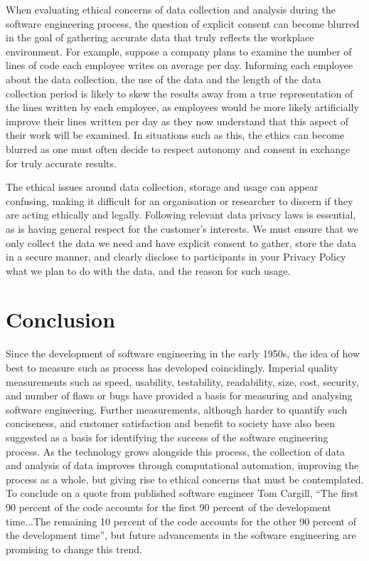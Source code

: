 \documentclass{article}
\begin{document}
When evaluating ethical concerns of data collection and analysis during the software engineering process, the question of explicit consent can become blurred in the goal of gathering accurate data that truly reflects the workplace environment. For example, suppose a company plans to examine the number of lines of code each employee writes on average per day. Informing each employee about the data collection, the use of the data and the length of the data collection period is likely to skew the results away from a true representation of the lines written by each employee, as employees would be more likely artificially improve their lines written per day as they now understand that this aspect of their work will be examined. In situations such as this, the ethics can become blurred as one must often decide to respect autonomy and consent in exchange for truly accurate results. \newline

The ethical issues around data collection, storage and usage can appear confusing, making it difficult for an organisation or researcher to discern if they are acting ethically and legally. Following relevant data privacy laws is essential, as is having general respect for the customer’s interests. We must ensure that we only collect the data we need and have explicit consent to gather, store the data in a secure manner, and clearly disclose to participants in your Privacy Policy what we plan to do with the data, and the reason for such usage.  \newline

\section{Conclusion} Since the development of software engineering in the early 1950s, the idea of how best to measure such as process has developed coincidingly. Imperial quality measurements such as speed, usability, testability, readability, size, cost, security, and number of flaws or bugs have provided a basis for measuring and analysing software engineering. Further measurements, although harder to quantify such conciseness, and customer satisfaction and benefit to society have also been suggested as a basis for identifying the success of the software engineering process. As the technology grows alongside this process, the collection of data and analysis of data improves through computational automation, improving the process as a whole, but giving rise to ethical concerns that must be contemplated. To conclude on a quote from published software engineer Tom Cargill, ``The first 90 percent of the code accounts for the first 90 percent of the development time...The remaining 10 percent of the code accounts for the other 90 percent of the development time'', but future advancements in the software engineering are promising to change this trend. 
\end{document}
